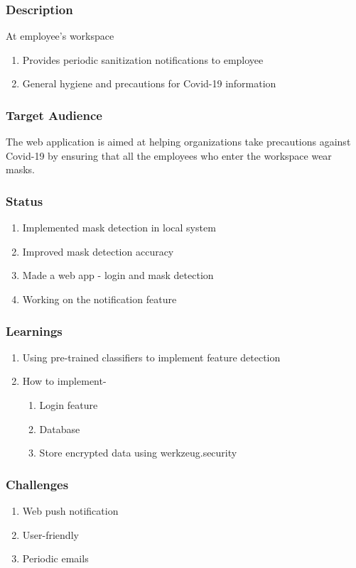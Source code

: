 \documentclass[14pt]{beamer}
\begin{document}
\begin{frame}
    \frametitle{Description}
    At employee's workspace
    \begin{enumerate}
        \item Provides periodic sanitization notifications to employee
            
        \item General hygiene and precautions for Covid-19 information
    \end{enumerate}
\end{frame}

\begin{frame}
    \frametitle{Target Audience}
    The web application is  aimed at helping organizations take precautions against Covid-19 by ensuring that all the employees who enter the workspace wear masks.
\end{frame}

\begin{frame}
    \frametitle{Status}
    \begin{enumerate}
        \item Implemented mask detection in local system
        \item Improved mask detection accuracy
        \item Made a web app - login and mask detection
        \item Working on the notification feature
    \end{enumerate}
\end{frame}

\begin{frame}
    \frametitle{Learnings}
    \begin{enumerate}
        \item Using pre-trained classifiers to implement feature detection
        \item How to implement-
        \begin{enumerate}
            \item Login feature
            \item Database
            \item Store encrypted data using werkzeug.security
        \end{enumerate}
    \end{enumerate}
\end{frame}
\begin{frame}
    \frametitle{Challenges}
    \begin{enumerate}
        \item Web push notification
        \item User-friendly
        \item Periodic emails
    \end{enumerate}
\end{frame}
\end{document}

